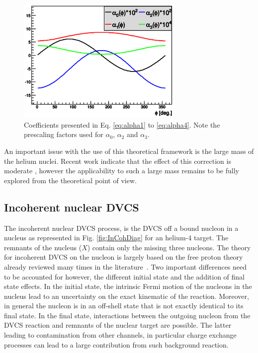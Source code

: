 \documentclass[aps,prc,preprint,superscriptaddress]{revtex4}
\begin{document}
\begin{figure}[tbp!]
\center
\includegraphics[width=8cm]{fig3/AlphaCoefs.png}
	\caption{Coefficients presented in Eq. \ref{eq:alpha1} to \ref{eq:alpha4}.
	Note the prescaling factors used for $\alpha_0$, $\alpha_2$ and $\alpha_3$.}
\label{fig:alphas}
\end{figure}

An important issue with the use of this theoretical framework is the large mass of the 
helium nuclei. Recent work indicate that the effect of this correction is moderate 
\cite{Braun:2012bg}, however the applicability to such a large mass remains to be
fully explored from the theoretical point of view.

\subsection{Incoherent nuclear DVCS}

The incoherent nuclear DVCS process, is the DVCS off a bound nucleon in a nucleus
as represented in Fig. \ref{fig:InCohDiag} for an helium-4 target. The remnants of 
the nucleus ($X$) contain only the missing three nucleons. 
The theory for incoherent DVCS on the nucleon is largely based on the free proton theory
already reviewed many times in the literature~\cite{Diehl:2003ny,Belitsky:2005qn,Guidal:2013rya}. 
Two important differences need to be accounted for however, the different initial state and the addition of 
final state effects. In the initial state, the intrinsic Fermi motion of the nucleons in the nucleus 
lead to an uncertainty on the exact kinematic of the reaction. Moreover, in general the nucleon 
is in an off-shell state that is not exactly identical to its final state. In the final state, 
interactions between the outgoing nucleon from the DVCS reaction and remnants of the nuclear 
target are possible. The latter leading to contamination from other channels, in particular 
charge exchange processes can lead to a large contribution from such background reaction. 
\end{document}
